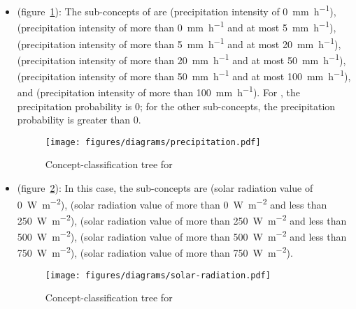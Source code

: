 \begin{itemize}
  \item {} (figure~\ref{fig:tree_precipitation}): The sub-concepts of  are  (precipitation intensity of \SI{0}{\milli\metre\per\hour}),  (precipitation intensity of more than \SI{0}{\milli\metre\per\hour} and at most \SI{5}{\milli\metre\per\hour}),  (precipitation intensity of more than \SI{5}{\milli\metre\per\hour} and at most \SI{20}{\milli\metre\per\hour}),  (precipitation intensity of more than \SI{20}{\milli\metre\per\hour} and at most \SI{50}{\milli\metre\per\hour}),  (precipitation intensity of more than \SI{50}{\milli\metre\per\hour} and at most \SI{100}{\milli\metre\per\hour}), and  (precipitation intensity of more than \SI{100}{\milli\metre\per\hour}). For , the precipitation probability is \num{0}; for the other sub-concepts, the precipitation probability is greater than \num{0}.
  
  \begin{figure}
    \centering
    \texttt{[image: figures/diagrams/precipitation.pdf]}
    \caption{Concept-classification tree for }
    \label{fig:tree_precipitation}
  \end{figure}
  
  \item {} (figure~\ref{fig:tree_solar_radiation}): In this case, the sub-concepts are  (solar radiation value of \SI{0}{\watt\per\square\meter}),  (solar radiation value of more than \SI{0}{\watt\per\square\meter} and less than \SI{250}{\watt\per\square\meter}),  (solar radiation value of more than \SI{250}{\watt\per\square\meter} and less than \SI{500}{\watt\per\square\meter}),  (solar radiation value of more than \SI{500}{\watt\per\square\meter} and less than \SI{750}{\watt\per\square\meter}),  (solar radiation value of more than \SI{750}{\watt\per\square\meter}).
  
  \begin{figure}
    \centering
    \texttt{[image: figures/diagrams/solar-radiation.pdf]}
    \caption{Concept-classification tree for }
    \label{fig:tree_solar_radiation}
  \end{figure}


\end{itemize}
